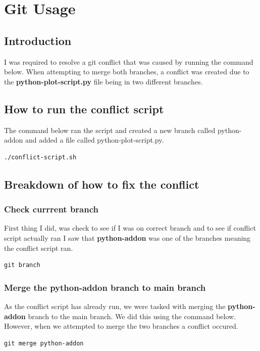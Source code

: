 \documentclass[]{article}
\begin{document}
\section{Git Usage}
\subsection{Introduction}
I was required to resolve a git conflict that was caused by running the command below. When attempting to merge both branches,
a conflict was created due to the \textbf{python-plot-script.py} file being in two different branches.
\subsection{How to run the conflict script}
The command below ran the script and created a new branch called python-addon and added a file called python-plot-script.py.
\begin{tcolorbox}[colback=white, colframe=black, boxrule=0.5pt, arc=2mm, 
    fonttitle=\bfseries, listing only, listing options={language=sh, basicstyle=\ttfamily}]
\begin{verbatim}
./conflict-script.sh
\end{verbatim}
\end{tcolorbox}
\subsection{Breakdown of how to fix the conflict}
\subsubsection{Check currrent branch}
First thing I did, was check to see if I was on correct branch and to see if conflict script actually ran
I saw that \textbf{python-addon} was one of the branches meaning the conflict script ran.
\begin{tcolorbox}[colback=white, colframe=black, boxrule=0.5pt, arc=2mm, 
    fonttitle=\bfseries, listing only, listing options={language=sh, basicstyle=\ttfamily}]
\begin{verbatim}
git branch
\end{verbatim}
\end{tcolorbox}
\subsubsection{Merge the python-addon branch to main branch}
As the conflict script has already run, we were tasked with merging the \textbf{python-addon} branch to the main
branch. We did this using the command below. However, when we attempted to merge the two branches a conflict occured.
\begin{tcolorbox}[colback=white, colframe=black, boxrule=0.5pt, arc=2mm, 
    fonttitle=\bfseries, listing only, listing options={language=sh, basicstyle=\ttfamily}]
\begin{verbatim}
git merge python-addon
\end{verbatim}
\end{tcolorbox}
\end{document}
